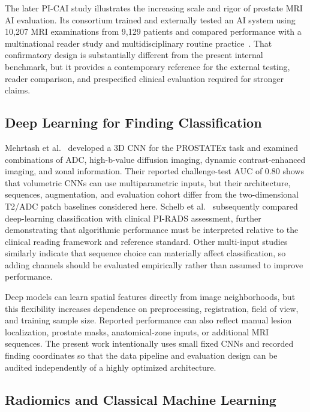 \documentclass[11pt]{article}
\begin{document}
The later PI-CAI study illustrates the increasing scale and rigor of prostate MRI AI evaluation. Its consortium trained and externally tested an AI system using 10,207 MRI examinations from 9,129 patients and compared performance with a multinational reader study and multidisciplinary routine practice~\cite{picai-confirmatory}. That confirmatory design is substantially different from the present internal benchmark, but it provides a contemporary reference for the external testing, reader comparison, and prespecified clinical evaluation required for stronger claims.

\subsection{Deep Learning for Finding Classification}\label{sec:2.2}

Mehrtash et al.~\cite{mehrtash-prostatex} developed a 3D CNN for the PROSTATEx task and examined combinations of ADC, high-b-value diffusion imaging, dynamic contrast-enhanced imaging, and zonal information. Their reported challenge-test AUC of 0.80 shows that volumetric CNNs can use multiparametric inputs, but their architecture, sequences, augmentation, and evaluation cohort differ from the two-dimensional T2/ADC patch baselines considered here. Schelb et al.~\cite{schelb-pirads} subsequently compared deep-learning classification with clinical PI-RADS assessment, further demonstrating that algorithmic performance must be interpreted relative to the clinical reading framework and reference standard. Other multi-input studies similarly indicate that sequence choice can materially affect classification, so adding channels should be evaluated empirically rather than assumed to improve performance.

Deep models can learn spatial features directly from image neighborhoods, but this flexibility increases dependence on preprocessing, registration, field of view, and training sample size. Reported performance can also reflect manual lesion localization, prostate masks, anatomical-zone inputs, or additional MRI sequences. The present work intentionally uses small fixed CNNs and recorded finding coordinates so that the data pipeline and evaluation design can be audited independently of a highly optimized architecture.

\subsection{Radiomics and Classical Machine Learning}\label{sec:2.3}
\end{document}
